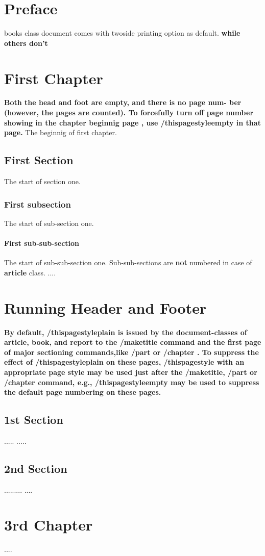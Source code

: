 \documentclass[openany]{book} %
\begin{document}
\chapter*{Preface}
{\Huge books class document comes with twoside printing option as default. \bf while others don't}

\chapter{First Chapter}
{\large\bf Both the head and foot are empty, and there is no page num- ber (however, the pages are counted).
To forcefully turn off page number showing in the chapter beginnig page , use /thispagestyle{empty} in that page.}
	The beginnig of first chapter.
		\section{First Section}
		The start of section one.
			\subsection{First subsection}
			The start of sub-section one.
				\subsubsection{First sub-sub-section}
					The start of sub-sub-section one. Sub-sub-sections are {\bf\Huge not} numbered in case of {\bf\huge article} class.
					\newpage
					....
\chapter{Running Header and Footer}
\bfseries\large
By default, /thispagestyle{plain} is issued by the document-classes of article, book, and report to the 
/maketitle command and the first page of major sectioning commands,like /part{ } or /chapter{ }. 
To suppress the effect of /thispagestyle{plain} on these pages, /thispagestyle{ } with an appropriate
 page style may be used just after the /maketitle, /part{ } or /chapter{ } command, 
 e.g., /thispagestyle{empty} may be used to suppress the default page numbering on these pages.
    \section{1st Section}
    .....
    \newpage
    .....
    \newpage
    \section{2nd Section}
    .........
    \newpage
    ....
    \chapter{3rd Chapter}
    ....
\end{document}
